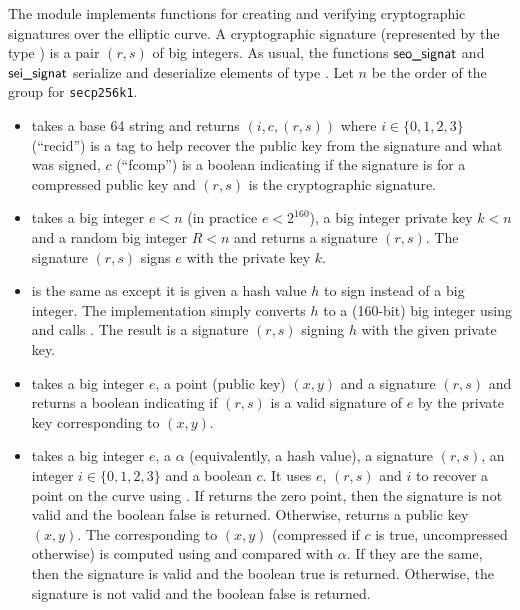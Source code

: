 The module {} implements functions for creating and verifying
cryptographic signatures over the elliptic curve.
A cryptographic signature (represented by the type {})
is a pair $(r,s)$ of big integers.
As usual, the functions ${\serfunc{seo\_signat}}$ and ${\serfunc{sei\_signat}}$
serialize and deserialize elements of type {}.
Let $n$ be the order of the group for {\tt{secp256k1}}.
\begin{itemize}
\item {} takes a base 64 string and returns $(i,c,(r,s))$
where $i\in\{0,1,2,3\}$ (``recid'') is a tag to help recover the public key from the signature
and what was signed,
$c$ (``fcomp'') is a boolean indicating if the signature is for a compressed public key
and $(r,s)$ is the cryptographic signature.
\item {} takes a big integer $e<n$ (in practice $e<2^{160}$),
a big integer private key $k<n$ and a random big integer $R<n$
and returns a signature $(r,s)$.
The signature $(r,s)$ signs $e$ with the private key $k$.
\item {} is the same as {} except
it is given a hash value $h$ to sign instead of a big integer.
The implementation simply converts $h$ to a (160-bit) big integer using {} and calls
{}.
The result is a signature $(r,s)$ signing $h$ with the given private key.
\item {} takes a big integer $e$, a point (public key) $(x,y)$
and a signature $(r,s)$
and returns a boolean indicating if $(r,s)$ is a valid
signature of $e$ by the private key corresponding to $(x,y)$.
\item {}
takes a big integer $e$, a {} $\alpha$ (equivalently, a hash value),
a signature $(r,s)$,
an integer $i\in\{0,1,2,3\}$
and a boolean $c$.
It uses $e$, $(r,s)$ and $i$ to recover a point on the curve using
{}.
If {} returns the zero point, then the signature is not valid and the boolean false is returned.
Otherwise, {} returns a public key $(x,y)$.
The {} corresponding to $(x,y)$ (compressed if $c$ is true, uncompressed otherwise)
is computed using {} and compared with $\alpha$.
If they are the same, then the signature is valid and the boolean true is returned.
Otherwise, the signature is not valid and the boolean false is returned.

\end{itemize}
